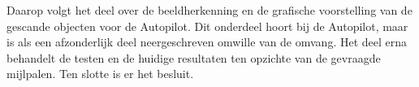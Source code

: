 Daarop volgt het deel over de beeldherkenning en de grafische voorstelling van de gescande objecten voor de Autopilot. Dit onderdeel hoort bij de Autopilot, maar is als een afzonderlijk deel neergeschreven omwille van de omvang. Het deel erna behandelt de testen en de huidige resultaten ten opzichte van de gevraagde mijlpalen. Ten slotte is er het besluit.
